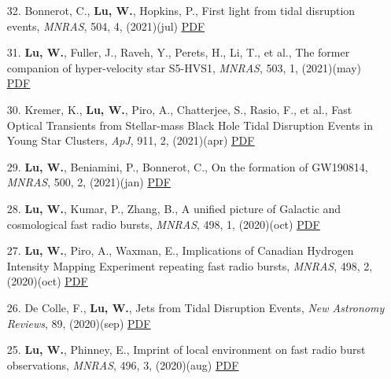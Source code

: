 \begin{itemize}[leftmargin=0.65cm]
\vspace{-0.1cm}
\item[32.]{Bonnerot, C., {\bf Lu, W.}, Hopkins, P., {First light from tidal disruption events}, {\it MNRAS}, 504, 4, (2021)(jul) \href{https://ui.adsabs.harvard.edu/abs/2021MNRAS.504.4885B}{\underline{PDF}}}

\vspace{-0.1cm}
\item[31.]{{\bf Lu, W.}, Fuller, J., Raveh, Y., Perets, H., Li, T., et al., {The former companion of hyper-velocity star S5-HVS1}, {\it MNRAS}, 503, 1, (2021)(may) \href{https://ui.adsabs.harvard.edu/abs/2021MNRAS.503..603L}{\underline{PDF}}}

\vspace{-0.1cm}
\item[30.]{Kremer, K., {\bf Lu, W.}, Piro, A., Chatterjee, S., Rasio, F., et al., {Fast Optical Transients from Stellar-mass Black Hole Tidal Disruption Events in Young Star Clusters}, {\it ApJ}, 911, 2, (2021)(apr) \href{https://ui.adsabs.harvard.edu/abs/2021ApJ...911..104K}{\underline{PDF}}}

\vspace{-0.1cm}
\item[29.]{{\bf Lu, W.}, Beniamini, P., Bonnerot, C., {On the formation of GW190814}, {\it MNRAS}, 500, 2, (2021)(jan) \href{https://ui.adsabs.harvard.edu/abs/2021MNRAS.500.1817L}{\underline{PDF}}}

\vspace{-0.1cm}
\item[28.]{{\bf Lu, W.}, Kumar, P., Zhang, B., {A unified picture of Galactic and cosmological fast radio bursts}, {\it MNRAS}, 498, 1, (2020)(oct) \href{https://ui.adsabs.harvard.edu/abs/2020MNRAS.498.1397L}{\underline{PDF}}}

\vspace{-0.1cm}
\item[27.]{{\bf Lu, W.}, Piro, A., Waxman, E., {Implications of Canadian Hydrogen Intensity Mapping Experiment repeating fast radio bursts}, {\it MNRAS}, 498, 2, (2020)(oct) \href{https://ui.adsabs.harvard.edu/abs/2020MNRAS.498.1973L}{\underline{PDF}}}

\vspace{-0.1cm}
\item[26.]{De Colle, F., {\bf Lu, W.}, {Jets from Tidal Disruption Events}, {\it New Astronomy Reviews}, 89, (2020)(sep) \href{https://ui.adsabs.harvard.edu/abs/2020NewAR..8901538D}{\underline{PDF}}}

\vspace{-0.1cm}
\item[25.]{{\bf Lu, W.}, Phinney, E., {Imprint of local environment on fast radio burst observations}, {\it MNRAS}, 496, 3, (2020)(aug) \href{https://ui.adsabs.harvard.edu/abs/2020MNRAS.496.3308L}{\underline{PDF}}}


\end{itemize}
